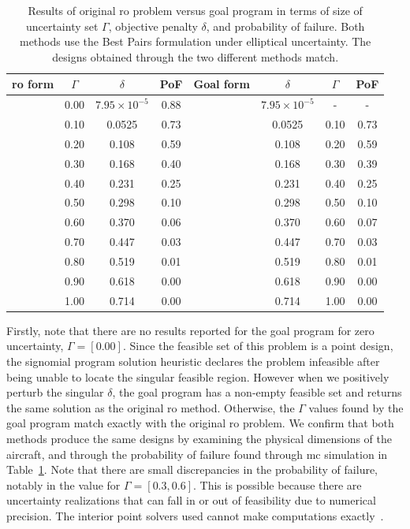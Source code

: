\begin{table}
\begin{center}
\caption{\label{tab:deltaVsGamma} Results of original \gls{ro} problem versus goal program in terms
of size of uncertainty set $\Gamma$, objective penalty $\delta$, and probability of failure. Both methods
use the Best Pairs formulation under elliptical uncertainty. The designs obtained through
the two different methods match.}
\begin{tabular}{c c c c c c c c}
\hline
 \gls{ro} form & $\Gamma$ & $\delta$ & PoF & Goal form & $\delta$ & $\Gamma$ & PoF\\
\hline
& 0.00 & $7.95 \times 10^{-5}$ & 0.88 & & $7.95 \times 10^{-5}$ & - & - \\
& 0.10 & 0.0525 & 0.73 & & 0.0525 & 0.10 & 0.73 \\
& 0.20 & 0.108 & 0.59 & & 0.108 & 0.20 & 0.59 \\
& 0.30 & 0.168 & 0.40 & & 0.168 & 0.30 & 0.39 \\
& 0.40 & 0.231 & 0.25 & & 0.231 & 0.40 & 0.25 \\
& 0.50 & 0.298 & 0.10 & & 0.298 & 0.50 & 0.10 \\
& 0.60 & 0.370 & 0.06 & & 0.370 & 0.60 & 0.07 \\
& 0.70 & 0.447 & 0.03 & & 0.447 & 0.70 & 0.03 \\
& 0.80 & 0.519 & 0.01 & & 0.519 & 0.80 & 0.01 \\
& 0.90 & 0.618 & 0.00 & & 0.618 & 0.90 & 0.00 \\
& 1.00 & 0.714 & 0.00 & & 0.714 & 1.00 & 0.00 \\
\end{tabular}
\end{center}
\end{table}

Firstly, note that there are no results reported for the goal program
for zero uncertainty, $\Gamma = [0.00]$.
Since the feasible set of this problem is a point design, the signomial program
solution heuristic declares the problem infeasible after being
unable to locate the singular feasible region. However when we positively perturb
the singular $\delta$, the goal program has a non-empty feasible set and
returns the same solution as the original \gls{ro} method.
Otherwise, the $\Gamma$ values found by the goal program match exactly
with the original \gls{ro} problem. We confirm that both methods produce
the same designs by examining the physical dimensions of the aircraft, and through the probability
of failure found through \gls{mc} simulation in Table~\ref{tab:deltaVsGamma}.
Note that there are small discrepancies
in the probability of failure, notably in the value for $\Gamma = [0.3, 0.6]$. This is
possible because there are uncertainty realizations that can fall
in or out of feasibility due to numerical precision. The interior point solvers
used cannot make computations exactly~\cite{Nesterov1994}.

